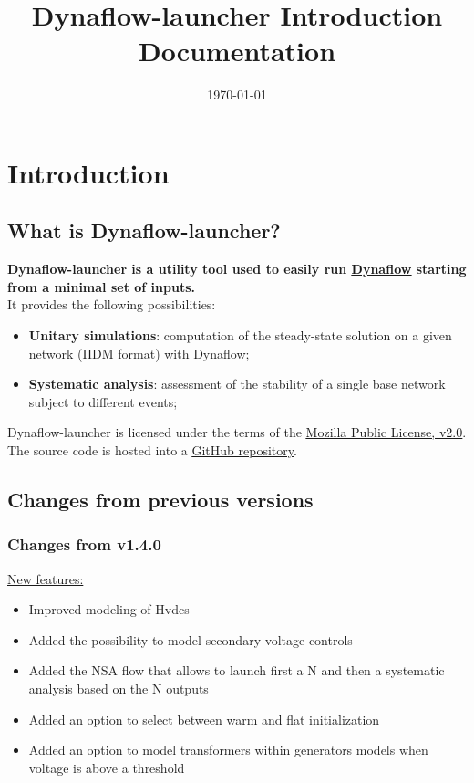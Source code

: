 \documentclass[a4paper, 12pt]{report}
\begin{document}
\title{Dynaflow-launcher Introduction Documentation}
\date\today

\maketitle
\tableofcontents

\chapter{Introduction}

\section{What is Dynaflow-launcher?}

\textbf{Dynaflow-launcher is a utility tool used to easily run \href{https://dynawo.github.io/about/dynaflow}{\underline{Dynaflow}}
starting from a minimal set of inputs.} \\

It provides the following possibilities:
\begin{itemize}
  \item \textbf{Unitary simulations}: computation of the steady-state solution on a given network (IIDM format) with Dynaflow;
  \item \textbf{Systematic analysis}: assessment of the stability of a single base network subject to different events;
\end{itemize}

Dynaflow-launcher is licensed under the terms of the \href{http://mozilla.org/MPL/2.0}{\underline{Mozilla Public License, v2.0}}.
The source code is hosted into a \href{https://github.com/dynawo/dynaflow-launcher} {\underline{GitHub repository}}. \\

\section{Changes from previous versions}

\subsection{Changes from v1.4.0}

\underline{New features:}
\begin{itemize}
\item Improved modeling of Hvdcs
\item Added the possibility to model secondary voltage controls
\item Added the NSA flow that allows to launch first a N and then a systematic analysis based on the N outputs
\item Added an option to select between warm and flat initialization
\item Added an option to model transformers within generators models when voltage is above a threshold
\end{itemize}
\end{document}
